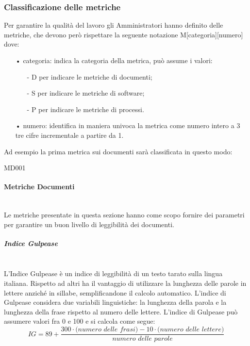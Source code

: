 \subsubsection{Classificazione delle metriche}
Per garantire la qualità del lavoro gli Amministratori hanno definito delle metriche, che devono però rispettare la seguente notazione M[categoria][numero] dove:
\begin{enumerate}
	\item[•]{categoria}: indica la categoria della metrica, può assume i valori:
	\begin{enumerate}
		\item[-] D per indicare le metriche di documenti;
		\item[-] S per indicare le metriche di software;
		\item[-] P per indicare le metriche di processi.
	\end{enumerate}
	\item[•]{numero}: identifica in maniera univoca la metrica come numero intero a 3 tre cifre incrementale a partire da 1.
\end{enumerate}
Ad esempio la prima metrica sui documenti sarà classificata in questo modo:
\begin{center}
	MD001
\end{center}

\paragraph{Metriche Documenti}\mbox{}\\
Le metriche presentate in questa sezione hanno come scopo fornire dei parametri per garantire un buon livello di leggibilità dei documenti.


\subparagraph{Indice Gulpease}\mbox{}\\
L'Indice Gulpease è un indice di leggibilità di un testo tarato sulla lingua italiana. Rispetto ad altri ha il vantaggio di utilizzare la lunghezza delle parole in lettere anziché in sillabe, semplificandone il calcolo automatico.
L'indice di Gulpease considera due variabili linguistiche: la lunghezza della parola e la lunghezza della frase rispetto al numero delle lettere.
L'indice di Gulpease può assumere valori fra 0 e 100 e si calcola come segue:
\[
IG = 89 + \frac{300 \cdot \textit{(numero delle frasi)} - 10 \cdot \textit{(numero delle lettere)}}{\textit{numero delle parole}}
\]

